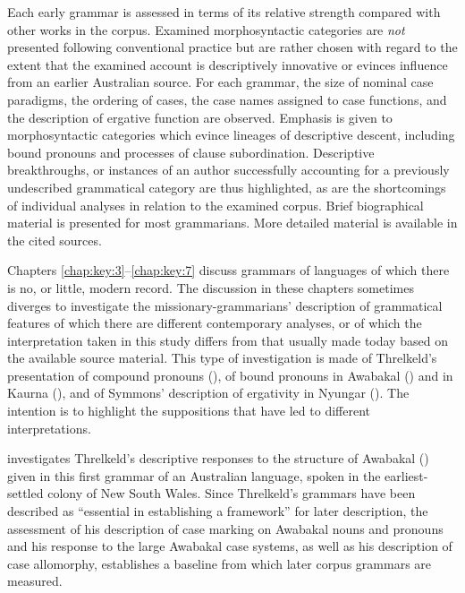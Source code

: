 Each early grammar is assessed in terms of its relative strength compared with other works in the corpus. Examined morphosyntactic categories are \textit{not} presented following conventional practice but are rather chosen with regard to the extent that the examined account is descriptively innovative or evinces influence from an earlier Australian source. For each grammar, the size of nominal case paradigms, the ordering of cases, the case names assigned to case functions, and the description of ergative function are observed. Emphasis is given to morphosyntactic categories which evince lineages of descriptive descent, including bound pronouns and processes of clause subordination. Descriptive breakthroughs, or instances of an author successfully accounting for a previously undescribed grammatical category are thus highlighted, as are the shortcomings of individual analyses in relation to the examined corpus. Brief biographical material is presented for most grammarians. More detailed material is available in the cited sources.

Chapters \ref{chap:key:3}–\ref{chap:key:7} discuss grammars of languages of which there is no, or little, modern record. The discussion in these chapters sometimes diverges to investigate the missionary-grammarians’ description of grammatical features of which there are different contemporary analyses, or of which the interpretation taken in this study differs from that usually made today based on the available source material. This type of investigation is made of Threlkeld’s presentation of compound pronouns (), of bound pronouns in Awabakal () and in Kaurna (), and of Symmons’ description of ergativity in Nyungar (). The intention is to highlight the suppositions that have led to different interpretations.

 investigates Threlkeld’s descriptive responses to the structure of Awabakal (\citeyear{threlkeld_australian_1836}) given in this first grammar of an Australian language, spoken in the earliest-settled colony of New South Wales. Since Threlkeld’s grammars have been described \citep[269]{carey_lancelot_2004} as “essential in establishing a framework” for later description, the assessment of his description of case marking on Awabakal nouns and pronouns and his response to the large Awabakal case systems, as well as his description of case allomorphy, establishes a baseline from which later corpus grammars are measured. 

